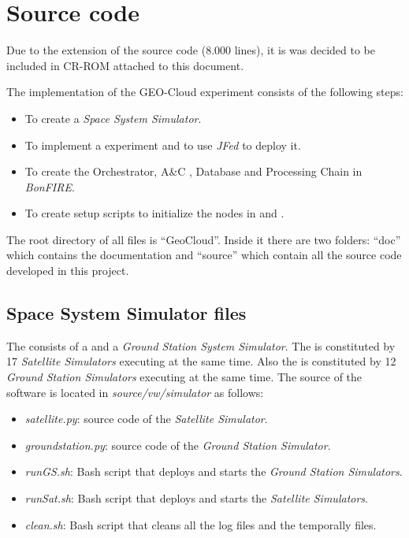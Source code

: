 \chapter{Source code}

Due to the extension of the source code (8.000 lines), it is was decided to be included
in CR-ROM attached to this document.

The implementation of the GEO-Cloud experiment consists of the following steps:
\begin{itemize}
\item To create a \emph{Space System Simulator}.
\item To implement a \vw experiment and to use \emph{JFed} to deploy it.
\item To create  the Orchestrator, A\&C , Database and Processing Chain in \emph{BonFIRE}.
\item To create setup scripts to initialize the nodes in \bonfire and \vw.
\end{itemize}

The root directory of all files is ``GeoCloud''. Inside it there are two folders: ``doc'' which contains
the documentation and ``source'' which contain all the source code developed in this
project.

\section{Space System Simulator files}

The \sss consists of a \satss and a \emph{Ground Station System Simulator}. The
\satss is constituted by 17
\emph{Satellite Simulators} executing at the same time. Also the \gsss is
constituted by 12 \emph{Ground Station Simulators} executing at the same time. The source of
the software is located in \emph{source/vw/simulator} as follows:
\begin{itemize}
\item \emph{satellite.py}: source code of the  \emph{Satellite Simulator}.
\item \emph{groundstation.py}: source code of the \emph{Ground Station Simulator}.
\item \emph{runGS.sh}: Bash script that deploys and starts the \emph{Ground Station Simulators}.
\item \emph {runSat.sh}: Bash script that deploys and starts the \emph{Satellite Simulators}.
\item \emph {clean.sh}: Bash script that cleans all the log files and the temporally files.
\end{itemize}

